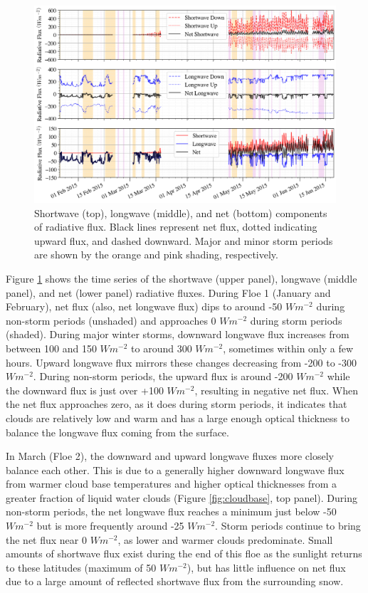 \begin{figure}[h]
    \centering
    \includegraphics[width=1\linewidth]{figures/chapter4/RadComp.png}
    \caption[Shortwave, longwave, and net radiative components of flux.]{Shortwave (top), longwave (middle), and net (bottom) components of radiative flux. Black lines represent net flux, dotted indicating upward flux, and dashed downward. Major and minor storm periods are shown by the orange and pink shading, respectively.}
    \label{fig:flux:all}
\end{figure}

Figure \ref{fig:flux:all} shows the time series of the shortwave (upper panel), longwave (middle panel), and net (lower panel) radiative fluxes. During Floe 1 (January and February), net flux (also, net longwave flux) dips to around -50 $Wm^{-2}$ during non-storm periods (unshaded) and approaches 0 $Wm^{-2}$ during storm periods (shaded). During major winter storms, downward longwave flux increases from between 100 and 150 $W m^{-2}$ to around 300 $Wm^{-2}$, sometimes within only a few hours. Upward longwave flux mirrors these changes decreasing from -200 to -300 $Wm^{-2}$. During non-storm periods, the upward flux is around -200 $Wm^{-2}$ while the downward flux is just over +100 $Wm^{-2}$, resulting in negative net flux. When the net flux approaches zero, as it does during storm periods, it indicates that clouds are relatively low and warm and has a large enough optical thickness to balance the longwave flux coming from the surface.

In March (Floe 2), the downward and upward longwave fluxes more closely balance each other. This is due to a generally higher downward longwave flux from warmer cloud base temperatures and higher optical thicknesses from a greater fraction of liquid water clouds (Figure \ref{fig:cloudbase}, top panel). During non-storm periods, the net longwave flux reaches a minimum just below -50 $Wm^{-2}$ but is more frequently around -25 $Wm^{-2}$. Storm periods continue to bring the net flux near 0 $Wm^{-2}$, as lower and warmer clouds predominate. Small amounts of shortwave flux exist during the end of this floe as the sunlight returns to these latitudes (maximum of 50 $Wm^{-2}$), but has little influence on net flux due to a large amount of reflected shortwave flux from the surrounding snow.

